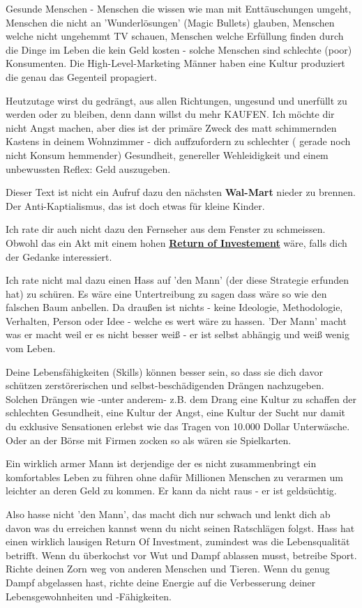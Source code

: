 Gesunde Menschen - Menschen die wissen wie man mit Enttäuschungen umgeht, Menschen die nicht an 'Wunderlösungen' (Magic Bullets) glauben, Menschen welche nicht ungehemmt TV schauen, Menschen welche Erfüllung finden durch die  Dinge im Leben die kein Geld kosten - solche Menschen sind schlechte (poor) Konsumenten. Die High-Level-Marketing Männer haben eine Kultur produziert die genau das Gegenteil propagiert.

Heutzutage wirst du gedrängt, aus allen Richtungen, ungesund und unerfüllt zu werden oder zu bleiben, denn dann willst du mehr KAUFEN. Ich möchte dir nicht Angst machen, aber dies ist der primäre Zweck des matt schimmernden Kastens in deinem Wohnzimmer - dich auffzufordern zu schlechter ( gerade noch nicht Konsum hemmender) Gesundheit, genereller Wehleidigkeit und einem unbewussten Reflex: Geld auszugeben. 

Dieser Text ist nicht ein Aufruf dazu den nächsten \textbf{Wal-Mart} nieder zu brennen. Der Anti-Kaptialismus, das  ist doch etwas für kleine Kinder.

Ich rate dir auch nicht dazu den Fernseher aus dem Fenster zu schmeissen. Obwohl das ein Akt mit einem hohen  \href{https://de.wikipedia.org/wiki/Return_on_Investment}{\textbf{Return of Investement}} wäre, falls dich der Gedanke interessiert. 

Ich rate nicht mal dazu einen Hass auf 'den Mann' (der diese Strategie erfunden hat) zu schüren. Es wäre eine Untertreibung zu sagen dass wäre so wie den falschen Baum anbellen. Da draußen ist nichts - keine Ideologie, Methodologie, Verhalten, Person oder Idee - welche es wert wäre zu hassen. 'Der Mann' macht was er macht weil er es nicht besser weiß - er ist selbst abhängig und weiß wenig vom Leben.

Deine Lebensfähigkeiten (Skills) können besser sein, so dass sie dich davor schützen zerstörerischen und selbst-beschädigenden Drängen nachzugeben. Solchen Drängen wie -unter anderem-  z.B. dem Drang eine Kultur zu schaffen der schlechten Gesundheit, eine Kultur der Angst, eine Kultur der Sucht nur damit du exklusive Sensationen erlebst wie das Tragen von 10.000 Dollar Unterwäsche. Oder an der Börse mit Firmen zocken so als wären sie Spielkarten. 

Ein wirklich armer Mann ist derjendige der es nicht zusammenbringt ein komfortables Leben zu führen ohne dafür Millionen Menschen zu verarmen um leichter an deren Geld zu kommen. Er kann da nicht raus - er ist geldsüchtig.

Also hasse nicht 'den Mann', das macht dich nur schwach und lenkt dich ab davon was du erreichen kannst wenn du nicht seinen Ratschlägen folgst. Hass hat einen wirklich lausigen Return Of Investment, zumindest was die Lebensqualität betrifft. Wenn du überkochst vor Wut und Dampf ablassen musst, betreibe Sport. Richte deinen Zorn weg von anderen Menschen und Tieren. Wenn du genug Dampf abgelassen hast, richte deine Energie auf die Verbesserung deiner Lebensgewohnheiten und -Fähigkeiten.

